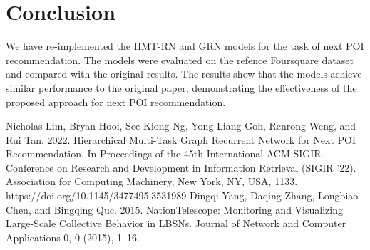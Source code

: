 \documentclass[twocolumn,twoside]{article}
\begin{document}
\section{Conclusion}
We have re-implemented the HMT-RN and GRN models for the task of
next POI recommendation. The models were evaluated on the refence
Foursquare dataset and compared with the original results. The
results show that the models achieve similar performance to the
original paper, demonstrating the effectiveness of the proposed
approach for next POI recommendation.
\begin{thebibliography}{9}
  Nicholas Lim, Bryan Hooi, See-Kiong Ng, Yong Liang Goh, Renrong Weng, and Rui Tan. 2022. Hierarchical Multi-Task Graph Recurrent Network for Next POI Recommendation. In Proceedings of the 45th International ACM SIGIR Conference on Research and Development in Information Retrieval (SIGIR '22). Association for Computing Machinery, New York, NY, USA, 1133. https://doi.org/10.1145/3477495.3531989
  Dingqi Yang, Daqing Zhang, Longbiao Chen, and Bingqing Quc. 2015. NationTelescope: Monitoring and Visualizing Large-Scale Collective Behavior in LBSNs.
  Journal of Network and Computer Applications 0, 0 (2015), 1–16.
\end{thebibliography}
\end{document}
